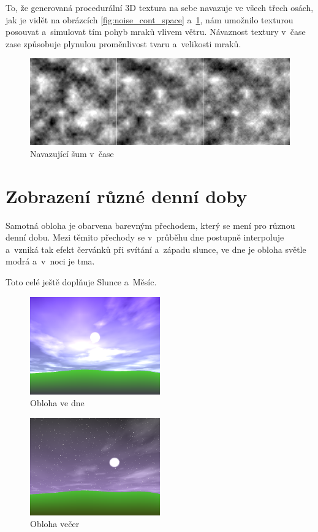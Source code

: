 \documentclass[12pt,a4paper,titlepage,final]{report}
\begin{document}
To, že generovaná procedurální 3D textura na sebe navazuje ve všech třech osách,
jak je vidět na obrázcích \ref{fig:noise_cont_space} a~\ref{fig:noise_cont_time},
nám umožnilo texturou posouvat a~simulovat tím pohyb mraků vlivem větru.
Návaznost textury v~čase zase způsobuje plynulou proměnlivost tvaru a~velikosti
mraků.

\begin{figure}[h] \centering
        \includegraphics[width=\textwidth]{images/sum123.png}
    \caption{Navazující šum v~čase} \label{fig:noise_cont_time}
\end{figure}

\section{Zobrazení různé denní doby}

Samotná obloha je obarvena barevným přechodem, který se mení pro různou denní
dobu. Mezi těmito přechody se v~průběhu dne postupně interpoluje a~vzniká
tak efekt červánků při svítání a~západu slunce, ve dne je obloha světle modrá
a~v~noci je tma.

Toto celé ještě doplňuje Slunce a~Měsíc.

\begin{figure}[h] \centering
        \includegraphics[width=0.5\textwidth]{images/sky0.png}
    \caption{Obloha ve dne} \label{fig:sky_day}
\end{figure}

\begin{figure}[h] \centering
        \includegraphics[width=0.5\textwidth]{images/sky1.png}
    \caption{Obloha večer} \label{fig:sky_evening}
\end{figure}
\end{document}
